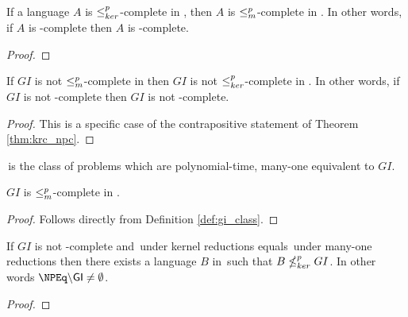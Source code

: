 \begin{theorem}\label{thm:krc_npc}If a language $A$ is $\leq^{p}_{ker}$-complete in \NPEq,
  then $A$ is $\leq^{p}_{m}$-complete in \NP. In other words, if $A$ is \NPEq-complete
  then $A$ is \NP-complete.\end{theorem}
\begin{proof}
\end{proof}

\begin{corollary}If $GI$ is not $\leq^{p}_{m}$-complete in \NP then $GI$ is not
  $\leq^{p}_{ker}$-complete in \NPEq. In other words, if $GI$ is not \NP-complete then
  $GI$ is not \NPEq-complete.\end{corollary}
\begin{proof}
  This is a specific case of the contrapositive statement of Theorem
  \ref{thm:krc_npc}.
\end{proof}

\begin{definition}\label{def:gi_class}\GI\,is the class of problems which are
  polynomial-time, many-one equivalent to $GI$.\end{definition}

\begin{lemma}$GI$ is $\leq^{p}_{m}$-complete in \GI.\end{lemma}
\begin{proof}Follows directly from Definition \ref{def:gi_class}.\end{proof}

\begin{theorem}If $GI$ is not \NP-complete and \NPEq\,under kernel reductions
  equals \GI\,under many-one reductions then there exists a language $B$ in
  \NPEq\,such that $B\nleq^{p}_{ker} GI$. In other words $\NPEq\backslash\GI\neq\emptyset$.\end{theorem}
\begin{proof}
\end{proof}
